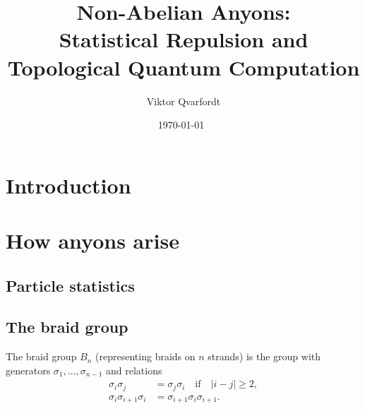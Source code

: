 \documentclass[a4paper,10pt,oneside]{book}
\theoremstyle{plain}
\theoremstyle{definition}
\theoremstyle{remark}
\begin{document}
\title{Non-Abelian Anyons:\\Statistical Repulsion and\\Topological Quantum Computation}
\author{Viktor Qvarfordt}
\date{\isodate\today\ \currenttime}
\maketitle
\tableofcontents
\newpage






















\chapter{Introduction}

\chapter{How anyons arise}\label{chap:how anyons arise}

\section{Particle statistics}

\section{The braid group}\label{sec:braid group}

The braid group $B_n$ (representing braids on $n$ strands) is the group with generators $σ_1, \ldots, σ_{n-1}$ and relations
\begin{subequations}
\label{eq:braid relations}
  \begin{align}
    \label{eq:braid relation 1}
    σ_i σ_j &= σ_j σ_i \quad\text{if}\quad |i-j| \ge 2, \\
    \label{eq:braid relation 2}
    σ_i σ_{i+1} σ_i &= σ_{i+1} σ_i σ_{i+1}.
  \end{align}
\end{subequations}
\end{document}
